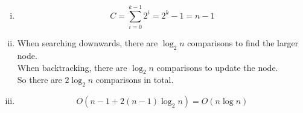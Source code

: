 \documentclass{article}
\begin{document}
\begin{enumerate}[i)]
\begin{minipage}{0.48\linewidth}
\begin{center}
\end{center}
\end{minipage}
\item
$$C=\sum_{i=0}^{k-1}2^{i}=2^k-1=n-1$$
\item
When searching downwards, there are $\log_2n$ comparisons to find the larger node.\\
When backtracking, there are $\log_2n$ comparisons to update the node.\\
So there are $2\log_2n$ comparisons in total.
\item
$$O(n-1+2(n-1)\log_2n)=O(n\log n)$$
\end{enumerate}
\end{document}
